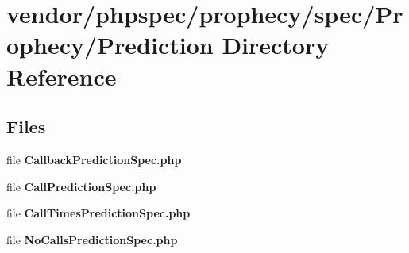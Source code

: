 \section{vendor/phpspec/prophecy/spec/\+Prophecy/\+Prediction Directory Reference}
\label{dir_1330126958c21a27f44e859019f35cbd}
\subsection*{Files}
\begin{DoxyCompactItemize}
\item 
file {\bf Callback\+Prediction\+Spec.\+php}
\item 
file {\bf Call\+Prediction\+Spec.\+php}
\item 
file {\bf Call\+Times\+Prediction\+Spec.\+php}
\item 
file {\bf No\+Calls\+Prediction\+Spec.\+php}
\end{DoxyCompactItemize}
